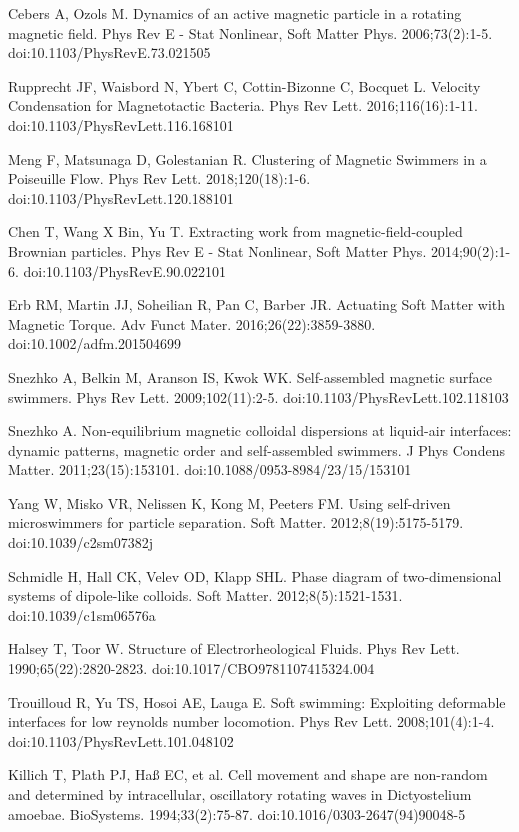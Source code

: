 \documentclass[11pt]{article}
\begin{document}
\begin{thebibliography}{9}
Cebers A, Ozols M. Dynamics of an active magnetic particle in a rotating magnetic field. Phys Rev E - Stat Nonlinear, Soft Matter Phys. 2006;73(2):1-5. doi:10.1103/PhysRevE.73.021505

Rupprecht JF, Waisbord N, Ybert C, Cottin-Bizonne C, Bocquet L. Velocity Condensation for Magnetotactic Bacteria. Phys Rev Lett. 2016;116(16):1-11. doi:10.1103/PhysRevLett.116.168101

Meng F, Matsunaga D, Golestanian R. Clustering of Magnetic Swimmers in a Poiseuille Flow. Phys Rev Lett. 2018;120(18):1-6. doi:10.1103/PhysRevLett.120.188101

Chen T, Wang X Bin, Yu T. Extracting work from magnetic-field-coupled Brownian particles. Phys Rev E - Stat Nonlinear, Soft Matter Phys. 2014;90(2):1-6. doi:10.1103/PhysRevE.90.022101

Erb RM, Martin JJ, Soheilian R, Pan C, Barber JR. Actuating Soft Matter with Magnetic Torque. Adv Funct Mater. 2016;26(22):3859-3880. doi:10.1002/adfm.201504699

Snezhko A, Belkin M, Aranson IS, Kwok WK. Self-assembled magnetic surface swimmers. Phys Rev Lett. 2009;102(11):2-5. doi:10.1103/PhysRevLett.102.118103

Snezhko A. Non-equilibrium magnetic colloidal dispersions at liquid-air interfaces: dynamic patterns, magnetic order and self-assembled swimmers. J Phys Condens Matter. 2011;23(15):153101. doi:10.1088/0953-8984/23/15/153101

Yang W, Misko VR, Nelissen K, Kong M, Peeters FM. Using self-driven microswimmers for particle separation. Soft Matter. 2012;8(19):5175-5179. doi:10.1039/c2sm07382j

Schmidle H, Hall CK, Velev OD, Klapp SHL. Phase diagram of two-dimensional systems of dipole-like colloids. Soft Matter. 2012;8(5):1521-1531. doi:10.1039/c1sm06576a

Halsey T, Toor W. Structure of Electrorheological Fluids. Phys Rev Lett. 1990;65(22):2820-2823. doi:10.1017/CBO9781107415324.004

Trouilloud R, Yu TS, Hosoi AE, Lauga E. Soft swimming: Exploiting deformable interfaces for low reynolds number locomotion. Phys Rev Lett. 2008;101(4):1-4. doi:10.1103/PhysRevLett.101.048102

Killich T, Plath PJ, Haß EC, et al. Cell movement and shape are non-random and determined by intracellular, oscillatory rotating waves in Dictyostelium amoebae. BioSystems. 1994;33(2):75-87. doi:10.1016/0303-2647(94)90048-5


\end{thebibliography}
\end{document}
